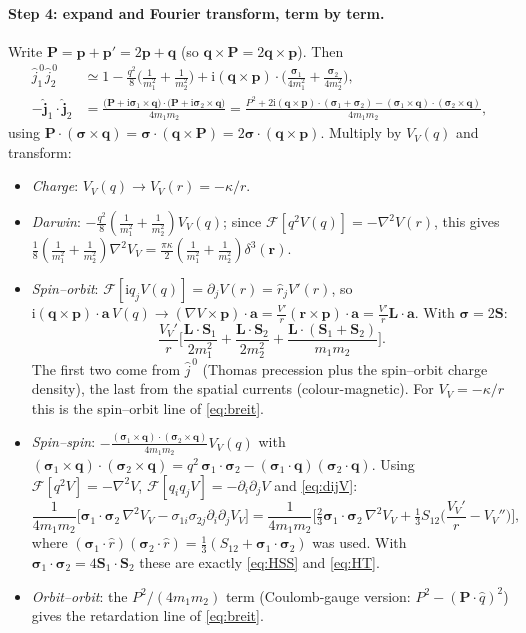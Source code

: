 \documentclass[11pt,a4paper]{article}
\numberwithin{equation}{section}
\theoremstyle{definition}
\theoremstyle{plain}
\theoremstyle{remark}
\numberwithin{algorithm}{section}
\newcommand{\vr}{\bm r}
\newcommand{\vp}{\bm p}
\newcommand{\vq}{\bm q}
\newcommand{\vL}{\bm L}
\newcommand{\vS}{\bm S}
\newcommand{\vsig}{\bm\sigma}
\newcommand{\ii}{\mathrm{i}}
\begin{document}
\paragraph{Step 4: expand and Fourier transform, term by term.} Write $\bm P=\vp+\vp'=2\vp+\vq$ (so $\vq\times\bm P=2\vq\times\vp$). Then
\begin{align*}
\hat j_1^{\,0}\hat j_2^{\,0}&\simeq1-\frac{q^2}{8}\Big(\frac1{m_1^2}+\frac1{m_2^2}\Big)+\ii(\vq\times\vp)\cdot\Big(\frac{\vsig_1}{4m_1^2}+\frac{\vsig_2}{4m_2^2}\Big),\\
-\hat{\bm j}_1\cdot\hat{\bm j}_2&=\frac{\big(\bm P+\ii\vsig_1\times\vq\big)\cdot\big(\bm P+\ii\vsig_2\times\vq\big)}{4m_1m_2}
=\frac{P^2+2\ii(\vq\times\vp)\cdot(\vsig_1+\vsig_2)-(\vsig_1\times\vq)\cdot(\vsig_2\times\vq)}{4m_1m_2},
\end{align*}
using $\bm P\cdot(\vsig\times\vq)=\vsig\cdot(\vq\times\bm P)=2\vsig\cdot(\vq\times\vp)$. Multiply by $V_V(q)$ and transform:
\begin{itemize}[leftmargin=1.3em,itemsep=3pt]
\item \emph{Charge}: $V_V(q)\to V_V(r)=-\kappa/r$.
\item \emph{Darwin}: $-\frac{q^2}8(\frac1{m_1^2}+\frac1{m_2^2})V_V(q)$; since $\mathcal F[q^2V(q)]=-\nabla^2V(r)$, this gives $\frac18(\frac1{m_1^2}+\frac1{m_2^2})\nabla^2V_V=\frac{\pi\kappa}{2}(\frac1{m_1^2}+\frac1{m_2^2})\delta^3(\vr)$. \checkmark
\item \emph{Spin--orbit}: $\mathcal F[\ii q_jV(q)]=\partial_jV(r)=\hat r_jV'(r)$, so $\ii(\vq\times\vp)\cdot\bm a\,V(q)\to(\nabla V\times\vp)\cdot\bm a=\frac{V'}r(\vr\times\vp)\cdot\bm a=\frac{V'}{r}\vL\cdot\bm a$. With $\vsig=2\vS$:
\begin{equation*}
\frac{V_V'}{r}\Big[\frac{\vL\cdot\vS_1}{2m_1^2}+\frac{\vL\cdot\vS_2}{2m_2^2}+\frac{\vL\cdot(\vS_1+\vS_2)}{m_1m_2}\Big].
\end{equation*}
The first two come from $\hat j^{\,0}$ (Thomas precession plus the spin--orbit charge density), the last from the spatial currents (colour-magnetic). For $V_V=-\kappa/r$ this is the spin--orbit line of \eqref{eq:breit}. \checkmark
\item \emph{Spin--spin}: $-\frac{(\vsig_1\times\vq)\cdot(\vsig_2\times\vq)}{4m_1m_2}V_V(q)$ with $(\vsig_1\times\vq)\cdot(\vsig_2\times\vq)=q^2\,\vsig_1\cdot\vsig_2-(\vsig_1\cdot\vq)(\vsig_2\cdot\vq)$. Using $\mathcal F[q^2V]=-\nabla^2V$, $\mathcal F[q_iq_jV]=-\partial_i\partial_jV$ and \eqref{eq:dijV}:
\begin{equation*}
\frac{1}{4m_1m_2}\Big[\vsig_1\cdot\vsig_2\,\nabla^2V_V-\sigma_{1i}\sigma_{2j}\partial_i\partial_jV_V\Big]
=\frac{1}{4m_1m_2}\Big[\tfrac23\vsig_1\cdot\vsig_2\,\nabla^2V_V+\tfrac13S_{12}\Big(\frac{V_V'}r-V_V''\Big)\Big],
\end{equation*}
where $(\vsig_1\cdot\hat r)(\vsig_2\cdot\hat r)=\frac13(S_{12}+\vsig_1\cdot\vsig_2)$ was used. With $\vsig_1\cdot\vsig_2=4\vS_1\cdot\vS_2$ these are exactly \eqref{eq:HSS} and \eqref{eq:HT}. \checkmark
\item \emph{Orbit--orbit}: the $P^2/(4m_1m_2)$ term (Coulomb-gauge version: $P^2-(\bm P\cdot\hat q)^2$) gives the retardation line of \eqref{eq:breit}.
\end{itemize}
\end{document}
